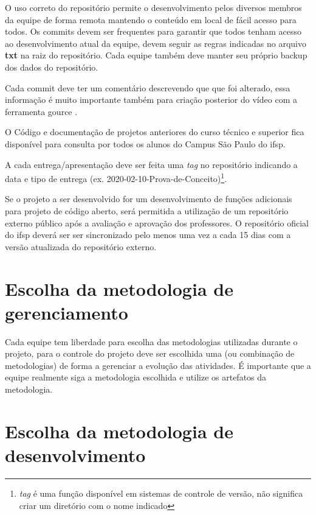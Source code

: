 O uso correto do repositório permite o desenvolvimento pelos diversos membros da equipe de forma remota mantendo o conteúdo em local de fácil acesso para todos. Os \glspl{commit} devem ser frequentes para garantir que todos tenham acesso ao desenvolvimento atual da equipe, devem seguir as regras indicadas no arquivo \textbf{txt} na raiz do repositório. Cada equipe também deve manter seu próprio \gls{backup} dos dados do repositório.

Cada \gls{commit} deve ter um comentário descrevendo que que foi alterado, essa informação é muito importante também para criação posterior do vídeo com a ferramenta \gls{gource} .

O Código e documentação de projetos anteriores do curso técnico e superior fica disponível para consulta por todos os alunos do Campus São Paulo do \ac{ifsp}.

A cada entrega/apresentação deve ser feita uma \emph{tag} no repositório indicando a data e tipo de entrega (ex. 2020-02-10-Prova-de-Conceito)\footnote{ \emph{tag} é uma função disponível em sistemas de controle de versão, não significa criar um diretório com o nome indicado}.

Se o projeto a ser desenvolvido for um desenvolvimento de funções adicionais para projeto de código aberto, será permitida a utilização de um repositório externo público após a avaliação e aprovação dos professores. O repositório oficial do \ac{ifsp} deverá ser ser sincronizado pelo menos uma vez a cada 15 dias com a versão atualizada do repositório externo.






\section{Escolha da metodologia de gerenciamento}\label{atv-metodologia-gerenciamento}

Cada equipe tem liberdade para escolha das metodologias utilizadas durante o projeto, para o controle do projeto deve ser escolhida uma (ou combinação de metodologias) de forma a gerenciar a evolução das atividades. É importante que a equipe realmente siga a metodologia escolhida e utilize os artefatos da metodologia.

\section{Escolha da metodologia de desenvolvimento}\label{atv-metodologia-desenvolvimento}

